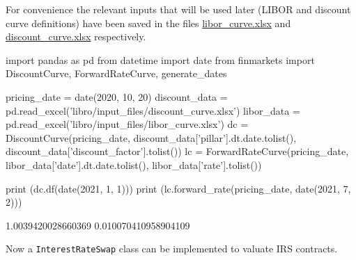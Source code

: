 For convenience the relevant inputs that will be used later (LIBOR and discount curve definitions) have been saved in the files  \href{https://github.com/matteosan1/finance_course/raw/develop/libro/input_files/libor_curve.xlsx}{libor\_curve.xlsx} and \href{https://github.com/matteosan1/finance_course/raw/develop/libro/input_files/discount_curve.xlsx}{discount\_curve.xlsx} respectively.

\begin{ipython}
import pandas as pd
from datetime import date
from finmarkets import DiscountCurve, ForwardRateCurve, generate_dates

pricing_date = date(2020, 10, 20)
discount_data = pd.read_excel('libro/input_files/discount_curve.xlsx')
libor_data = pd.read_excel('libro/input_files/libor_curve.xlsx')
dc = DiscountCurve(pricing_date,
discount_data['pillar'].dt.date.tolist(),
discount_data['discount_factor'].tolist())
lc = ForwardRateCurve(pricing_date, 
libor_data['date'].dt.date.tolist(),
libor_data['rate'].tolist())

print (dc.df(date(2021, 1, 1)))
print (lc.forward_rate(pricing_date, date(2021, 7, 2)))
\end{ipython}
\begin{ioutput}
1.0039420028660369
0.010070410958904109
\end{ioutput}

Now a \texttt{InterestRateSwap} class can be implemented to valuate IRS contracts.

